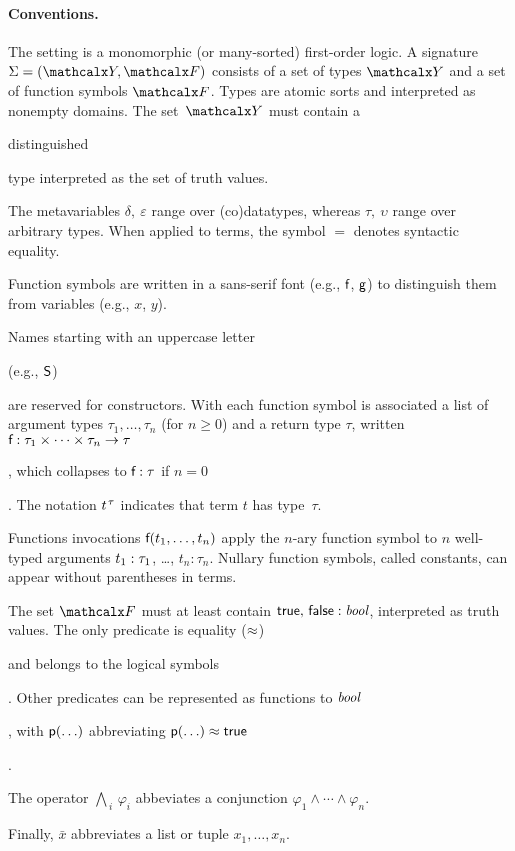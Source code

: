 \begin{conf}
\kern-2.9pt %
\end{conf}

\paragraph{Conventions.}
The setting is a monomorphic (or many-sorted) first-order logic.
A signature $\Sig = (\Types, \Funcs)$ consists of a set of types $\Types$ and a
set of function symbols $\Funcs$. Types are atomic sorts and interpreted as
nonempty domains. The set~$\Types$ must contain a
\begin{rep}distinguished \end{rep}type  interpreted as the set of truth
values. %
\begin{rep}
The metavariables $\delta,\:\varepsilon$ range over (co)datatypes,
whereas $\tau,\:\upsilon$ range over arbitrary types.
When applied to terms, the symbol $=$ denotes syntactic equality.

Function symbols are written in a sans-serif font (e.g., $\textsf{f}$, $\textsf{g}$) to
distinguish them from variables (e.g., $x$, $y$).
\end{rep}
Names starting with an uppercase letter \begin{rep}(e.g.,
$\textsf{S}$) \end{rep}are reserved for constructors. With each function symbol 
is associated a list of argument types $\tau_1,\ldots,\tau_n$ (for $n \ge 0$)
and a return type $\tau$, written
$\textsf{f} : \tau_1 \times \cdots \times \tau_n \to \tau$\begin{rep},
which collapses to $\textsf{f} : \tau$ if $n = 0$\end{rep}.
The notation $t\typ{\tau}$ indicates that term $t$ has type~$\tau$.
\begin{rep}%
Functions invocations $\textsf{f}(t_1,\ldots,t_n)$
apply the $n$-ary function symbol
 to $n$ well-typed arguments $t_1 :\nobreak \tau_1$, \ldots, $t_n :
\tau_n$. Nullary function symbols, called constants, can appear without
parentheses in terms.
\end{rep}
The set $\Funcs$ must at least contain
$\textsf{true},\, \textsf{false} : \textit{bool}$, interpreted as truth values.
The only predicate is equality ($\approx$)\begin{rep} and belongs to the logical symbols\end{rep}.
Other predicates can be represented as functions to $\textit{bool}$\begin{rep},
with $\textsf{p}(\ldots)$ abbreviating $\textsf{p}(\ldots) \approx \textsf{true}$\end{rep}.
\begin{rep}The operator $\bigwedge_{\,i}\, \varphi_i$ abbeviates a conjunction
$\varphi_1 \mathrel\land \cdots \mathrel\land \varphi_n$. \end{rep}%
Finally, $\bar x$ abbreviates a list or tuple $x_1,\ldots,x_n$.

